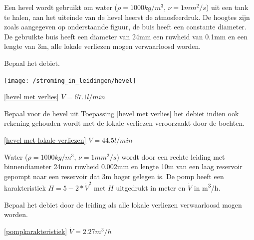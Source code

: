 \begin{toepassing}
	\label{hevel met verlies}
Een hevel wordt gebruikt om water ($\rho=1000\unit{kg/m^3}$, $\nu=1\unit{mm^2/s}$) uit een tank te halen, aan het uiteinde van de hevel heerst de atmosfeerdruk. De hoogtes zijn zoals aangegeven op onderstaande figuur, de buis heeft een constante diameter. De gebruikte buis heeft een diameter van 24mm een ruwheid van 0.1mm en een lengte van 3m, alle lokale verliezen mogen verwaarloosd worden.
		
Bepaal het debiet.

	\centering
	\texttt{[image: /stroming\_in\_leidingen/hevel]}
\end{toepassing}
\begin{antwoord}{\ref{hevel met verlies}}
	$\dot{V} = 67.1\unit{l/min}$
\end{antwoord}
\begin{toepassing}[*]
	\label{hevel met lokale verliezen}
Bepaal voor de hevel uit Toepassing \ref{hevel met verlies} het debiet indien ook rekening gehouden wordt met de lokale verliezen veroorzaakt door de bochten.

\end{toepassing}
\begin{antwoord}{\ref{hevel met lokale verliezen}}
	$\dot{V} = 44.5\unit{l/min}$
\end{antwoord}
\begin{toepassing}[*]
	\label{pompkarakteristiek}
Water ($\rho=1000\unit{kg/m^3}$, $\nu=1\unit{mm^2/s}$) wordt door een rechte leiding met binnendiameter 24mm ruwheid 0.002mm en lengte 10m van een laag reservoir gepompt naar een reservoir dat 3m hoger gelegen is. De pomp heeft een karakteristiek $H = 5 - 2*\dot{V}^2$ met $H$ uitgedrukt in meter en $\dot{V}$ in \unit{m^3/h}.

Bepaal het debiet door de leiding als alle lokale verliezen verwaarloosd mogen worden.
\end{toepassing}
\begin{antwoord}{\ref{pompkarakteristiek}}
	$\dot{V} = 2.27\unit{m^3/h}$
\end{antwoord}
